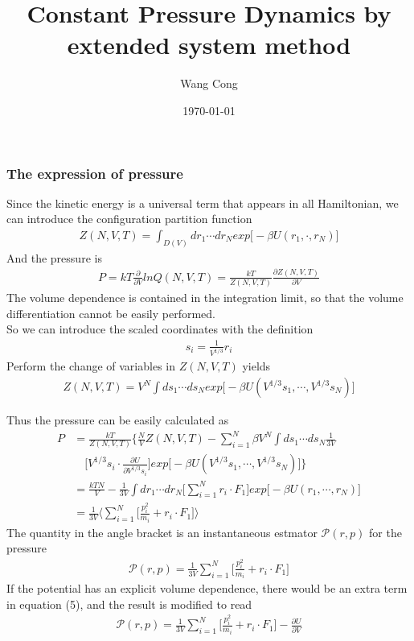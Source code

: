 \documentclass{beamer}
\begin{document}
    \title{Constant Pressure Dynamics by extended system method}
    \author{Wang Cong}
    \date{\today}
    \frame{\titlepage}

\begin{frame}
\frametitle{The expression of pressure}
\fontsize{9pt}{10pt}\selectfont
Since the kinetic energy is a universal term that appears in all Hamiltonian, we can introduce the configuration partition function
\begin{align}
Z(N,V,T)=\int_{D(V)}dr_1\cdots dr_Nexp\big[-\beta U(r_1,\cdot,r_N)\big]
\end{align}
And the pressure is
\begin{align}
P=kT\frac{\partial}{\partial V}lnQ(N,V,T)=\frac{kT}{Z(N,V,T)}\frac{\partial Z(N,V,T)}{\partial V}
\end{align}
The volume dependence is contained in the integration limit, so that the volume differentiation cannot be easily performed. \\
So we can introduce the scaled coordinates with the definition 
\begin{align}
s_i=\frac{1}{V^{1/3}}r_i
\end{align}
Perform the change of variables in $Z(N,V,T)$ yields
\begin{align}
Z(N,V,T)=V^N\int ds_1\cdots ds_Nexp\big[-\beta U(V^{1/3}s_1,\cdots,V^{1/3}s_N)\big]
\end{align}
\end{frame}
\begin{frame}
\fontsize{9pt}{10pt}\selectfont
Thus the pressure can be easily calculated as
\begin{align}
P&=\frac{kT}{Z(N,V,T)}\bigg\{\frac{N}{V}Z(N,V,T)-\sum_{i=1}^N\beta V^N\int ds_1\cdots ds_N\frac{1}{3V}\nonumber\\
&\quad\bigg[V^{1/3}s_i\cdot\frac{\partial U}{\partial V^{1/3}s_i}\bigg]exp\big[-\beta U(V^{1/3}s_1,\cdots, V^{1/3}s_N)\big]\bigg\}\\
&=\frac{kTN}{V}-\frac{1}{3V}\int dr_1\cdots dr_N\bigg[\sum_{i=1}^{N}r_i\cdot F_1\bigg]exp\big[-\beta U(r_1,\cdots, r_N)\big]\nonumber\\
&=\frac{1}{3V}\bigg\langle\sum_{i=1}^{N}\bigg[\frac{p_i^2}{m_i}+r_i\cdot F_1\bigg]\bigg\rangle
\end{align}
The quantity in the angle bracket is an instantaneous estmator $\mathcal{P}(r,p)$ for the pressure
\begin{align}
\mathcal{P}(r,p)=\frac{1}{3V}\sum_{i=1}^{N}\bigg[\frac{p_i^2}{m_i}+r_i\cdot F_1\bigg]
\end{align}
If the potential has an explicit volume dependence, there would be an extra term in equation (5), and the result is modified to read
\begin{align}
\mathcal{P}(r,p)=\frac{1}{3V}\sum_{i=1}^{N}\bigg[\frac{p_i^2}{m_i}+r_i\cdot F_1\bigg]-\frac{\partial U}{\partial V}
\end{align}
\end{frame}
\end{document}
